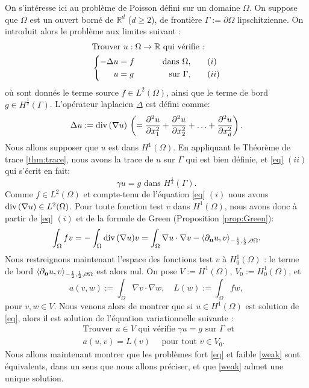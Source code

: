 \documentclass[11pt]{book}
\def\n{{\bf n}}
\newcommand{\R}{\mathbb{R}}
\renewcommand{\div} {{\rm{div} \,}}
\newcommand{\dnu}{\partial_{\n} u}
\begin{document}
On s'intéresse ici au problème de Poisson défini sur un domaine $\Omega$.
On suppose que $\Omega$ est un ouvert borné de $\R^d$ ($d\geq2$), de frontière $\Gamma := \partial \Omega$ lipschitzienne. 
On introduit alors le problème aux limites suivant :
\begin{align} 
\label{eq}
&\textrm{Trouver } u : \Omega \rightarrow \R \textrm{ qui vérifie :}\nonumber\\
&\left\{
\begin{aligned}
 -\Delta u &= f   &\qquad \hbox{ dans } \Omega,  &\qquad (i)\\ 
u &= g &\qquad \hbox{ sur } \Gamma,&\qquad (ii) 
\end{aligned}
\right.
\end{align}
où sont donnés le terme source $f\in L^2(\Omega)$, ainsi que le terme de bord $g\in H^{\frac12}(\Gamma)$.
L'opérateur laplacien $\Delta$ est défini comme:
\[
 \Delta u := \div ( \nabla u ) \, \left ( = \frac{\partial^2 u}{\partial x_1^2} + \frac{\partial^2 u}{\partial x_2^2} + \ldots + \frac{\partial^2 u}{\partial x_d^2} \right ).
\]
Nous allons supposer que $u$ est dans $H^1(\Omega)$. En appliquant le Théorème de trace \ref{thm:trace}, nous avons la trace de $u$ sur $\Gamma$ qui est bien définie, et \eqref{eq} $(ii)$ qui s'écrit en fait:
\[
\gamma u = g \mbox{ dans } H^{\frac12} (\Gamma).
\]
Comme $f \in L^2(\Omega)$ et compte-tenu de l'équation \eqref{eq} $(i)$ nous avons
$\div (\nabla u) \in L^2(\Omega)$. Pour toute fonction test $v$ dans $H^1(\Omega)$, nous avons donc à partir de \eqref{eq} $(i)$ et de la formule de Green (Proposition \ref{prop:Green}):
\[
\int_\Omega f v = 
- \int_\Omega \div (\nabla u) v 
= 
\int_\Omega \nabla u \cdot \nabla v
- \langle \dnu , v \rangle_{-\frac12,\frac12,\partial \Omega}.
\]
Nous restreignons maintenant l'espace des fonctions test $v$ à $H^1_0(\Omega)$ : le terme de bord 
$\langle \dnu , v \rangle_{-\frac12,\frac12,\partial \Omega}$ est alors nul.
On pose $V := H^1(\Omega)$, $V_0 := H^1_0(\Omega)$, et 
$$a(v,w):= \int_\Omega \nabla v \cdot \nabla w,  \quad
L(w) := \int_\Omega f w,$$ pour $v,w\in V$. 
Nous venons alors de montrer que si $u \in H^1(\Omega)$ est solution de \eqref{eq}, alors il est solution de l'équation variationnelle suivante :
\begin{align} 
\label{weak}
&\mbox{Trouver } u\in V \mbox{ qui vérifie } \gamma u=g \mbox{ sur } \Gamma \mbox{ et }\nonumber\\
&
a(u,v) = L(v) \quad \textrm{ pour tout } v \in V_0.
\end{align}
Nous allons maintenant montrer que les problèmes fort \eqref{eq} et faible \eqref{weak} sont équivalents, dans un sens que nous allons préciser, et que \eqref{weak} admet une unique solution.
\end{document}
